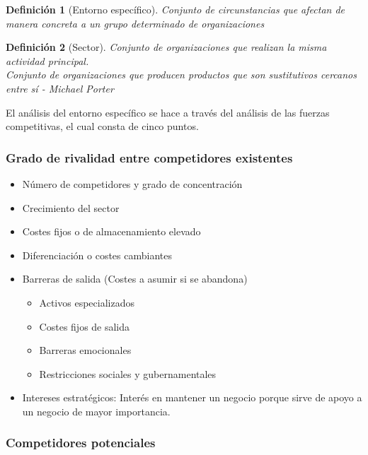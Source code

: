 \documentclass[12pt]{article}
\theoremstyle{definition_wo_parentheses}
\newtheorem{definicion}{Definición}[section]
\begin{document}
\begin{definicion}[Entorno específico]
	Conjunto de circunstancias que afectan de manera concreta a un grupo determinado de organizaciones
\end{definicion}

\begin{definicion}[Sector]
	Conjunto de organizaciones que realizan la misma actividad principal.\\
	Conjunto de organizaciones que producen productos que son sustitutivos cercanos entre sí - \textit{Michael Porter}
\end{definicion}

El análisis del entorno específico se hace a través del análisis de las fuerzas competitivas, el cual consta de cinco puntos.

\subsubsection{Grado de rivalidad entre competidores existentes}

\begin{itemize}
\item Número de competidores y grado de concentración
\item Crecimiento del sector
\item Costes fijos o de almacenamiento elevado
\item Diferenciación o costes cambiantes
\item Barreras de salida (Costes a asumir si se abandona)
	\begin{itemize}
	\item Activos especializados
	\item Costes fijos de salida
	\item Barreras emocionales
	\item Restricciones sociales y gubernamentales
	\end{itemize}
\item Intereses estratégicos: Interés en mantener un negocio porque sirve de apoyo a un negocio de mayor importancia.

\end{itemize}

\subsubsection{Competidores potenciales}
\end{document}
